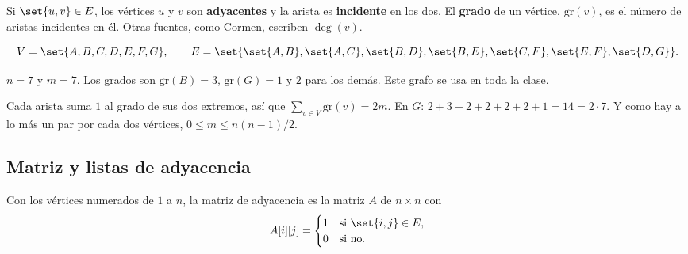 \documentclass[11pt,letterpaper]{article}
\begin{document}
Si $\set{u, v} \in E$, los vértices $u$ y $v$ son
\textbf{adyacentes} y la arista es \textbf{incidente} en los dos. El
\textbf{grado} de un vértice, $\text{gr}(v)$, es el número de aristas
incidentes en él. Otras fuentes, como Cormen, escriben $\deg(v)$.

\begin{ejemplo}
  \[
    V = \set{A, B, C, D, E, F, G} , \qquad
    E = \set{\set{A,B}, \set{A,C}, \set{B,D}, \set{B,E},
             \set{C,F}, \set{E,F}, \set{D,G}} .
  \]
  \begin{center}
  \end{center}
  $n = 7$ y $m = 7$. Los grados son $\text{gr}(B) = 3$,
  $\text{gr}(G) = 1$ y $2$ para los demás. Este grafo se usa en toda
  la clase.
\end{ejemplo}

\begin{observacion}
  Cada arista suma $1$ al grado de sus dos extremos, así que
  $\sum_{v \in V} \text{gr}(v) = 2m$. En $G$:
  $2 + 3 + 2 + 2 + 2 + 2 + 1 = 14 = 2 \cdot 7$. Y como hay a lo más
  un par por cada dos vértices, $0 \leq m \leq n(n-1)/2$.
\end{observacion}


\subsection*{Matriz y listas de adyacencia}

\begin{definicion}
  Con los vértices numerados de $1$ a $n$, la matriz de adyacencia es
  la matriz $A$ de $n \times n$ con
  \[
    A[i][j] =
    \begin{cases}
      1 & \text{si } \set{i, j} \in E , \\
      0 & \text{si no.}
    \end{cases}
  \]
\end{definicion}
\end{document}
